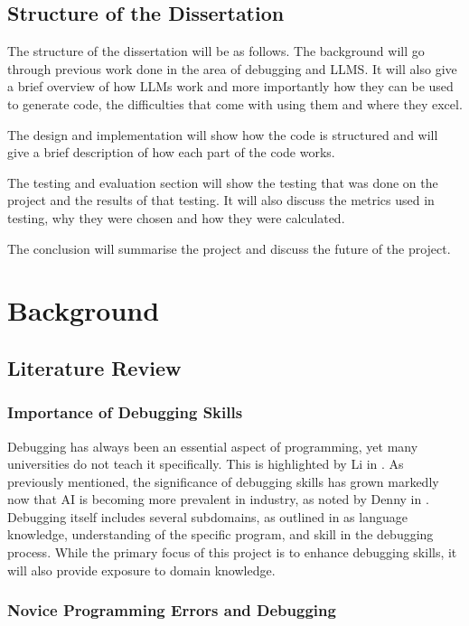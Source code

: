 \documentclass[12pt]{extarticle}
\begin{document}
\subsection{Structure of the Dissertation}

The structure of the dissertation will be as follows. The background will go through previous work done in the area of debugging and LLMS. It will also give a brief overview of how LLMs work and more importantly how they can be used to generate code, the difficulties that come with using them and where they excel. 

The design and implementation will show how the code is structured and will give a brief description of how each part of the code works.

The testing and evaluation section will show the testing that was done on the project and the results of that testing. It will also discuss the metrics used in testing, why they were chosen and how they were calculated.

The conclusion will summarise the project and discuss the future of the project.
\newpage
\section{Background}

\subsection{Literature Review}

\subsubsection{Importance of Debugging Skills}

Debugging has always been an essential aspect of programming, yet many universities do not teach it specifically. This is highlighted by Li in \cite{li2019}. As previously mentioned, the significance of debugging skills has grown markedly now that AI is becoming more prevalent in industry, as noted by Denny in \cite{denny2024}. Debugging itself includes several subdomains, as outlined in \cite{li2019} as language knowledge, understanding of the specific program, and skill in the debugging process. While the primary focus of this project is to enhance debugging skills, it will also provide exposure to domain knowledge.

\subsubsection{Novice Programming Errors and Debugging}
\end{document}
